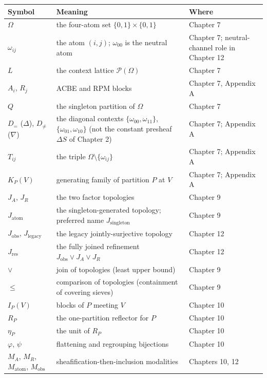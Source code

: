 \begin{longtable}{@{}l >{\raggedright\arraybackslash}p{} >{\raggedright\arraybackslash}p{}@{}}
\toprule
Symbol & Meaning & Where \\
\midrule
\endhead
\bottomrule
\endfoot
$\Omega$ & the four-atom set $\{0,1\} \times \{0,1\}$ & Chapter 7 \\
$\omega_{ij}$ & the atom $(i, j)$; $\omega_{00}$ is the neutral atom &
Chapter 7; neutral-channel role in Chapter 12 \\
$L$ & the context lattice $\mathcal{P}(\Omega)$ & Chapter 7 \\
$A_i$, $R_j$ & ACBE and RPM blocks & Chapter 7, Appendix A \\
$Q$ & the singleton partition of $\Omega$ & Chapter 7 \\
$D_{=}$ ($\Delta$), $D_{\neq}$ ($\nabla$) & the diagonal contexts
$\{\omega_{00}, \omega_{11}\}$, $\{\omega_{01}, \omega_{10}\}$ (not the
constant presheaf $\Delta S$ of Chapter 2) & Chapter 7; Appendix A \\
$T_{ij}$ & the triple $\Omega \setminus \{\omega_{ij}\}$ &
Chapter 7; Appendix A \\
$K_P(V)$ & generating family of partition $P$ at $V$ & Chapter 7;
Appendix A \\
$J_A$, $J_R$ & the two factor topologies & Chapter 9 \\
$J_{\mathrm{atom}}$ & the singleton-generated topology; preferred
name $J_{\mathrm{singleton}}$ & Chapter 9 \\
$J_{\mathrm{obs}}$, $J_{\mathrm{legacy}}$ & the legacy
jointly-surjective topology & Chapter 12 \\
$J_{\mathrm{res}}$ & the fully joined refinement
$J_{\mathrm{obs}} \vee J_A \vee J_R$ & Chapter 12 \\
$\vee$ & join of topologies (least upper bound) & Chapter 9 \\
$\le$ & comparison of topologies (containment of covering sieves) &
Chapter 9 \\
$I_P(V)$ & blocks of $P$ meeting $V$ & Chapter 10 \\
$R_P$ & the one-partition reflector for $P$ & Chapter 10 \\
$\eta_P$ & the unit of $R_P$ & Chapter 10 \\
$\varphi$, $\psi$ & flattening and regrouping bijections &
Chapter 10 \\
$M_A$, $M_R$, $M_{\mathrm{atom}}$, $M_{\mathrm{obs}}$ &
sheafification-then-inclusion modalities & Chapters 10, 12 \\

\end{longtable}
